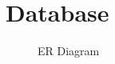 \section{Database}\label{sec:database}

\begin{figure}[!ht]
    \centering
    
    \caption{ER Diagram}
    \label{fig:er-diagram}
\end{figure}
